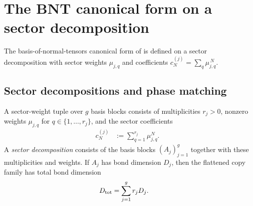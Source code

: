 \section{The BNT canonical form on a sector decomposition}
\label{sec:sector_bnt_api}

The basis-of-normal-tensors canonical form of
\cite[Section~2]{Cirac2016MPDO_arXiv} is defined on a sector decomposition with
sector weights $\mu_{j,q}$ and coefficients $c_N^{(j)} = \sum_q \mu_{j,q}^{\,N}$.

\subsection{Sector decompositions and phase matching}
\label{sec:bnt_sector_decompositions}

\begin{definition}%
    \label{def:sector_weight_data}
    \leanok
    A sector-weight tuple over $g$ basis blocks consists of multiplicities
    $r_j > 0$, nonzero weights $\mu_{j,q}$ for
    $q \in \{1,\ldots,r_j\}$, and the sector coefficients
    \begin{align}
        c_N^{(j)}
         & :=
        \sum_{q=1}^{r_j} \mu_{j,q}^N.
        \label{eq:bnt_sector_coeff_def}
    \end{align}
    A \emph{sector decomposition} consists of the basis blocks
    $(A_j)_{j=1}^g$ together with these multiplicities and weights. If $A_j$
    has bond dimension $D_j$, then the flattened copy family has total bond
    dimension
    \begin{align}
        D_{\mathrm{tot}}
         & =\sum_{j=1}^{g}r_jD_j.
        \notag
    \end{align}
\end{definition}

